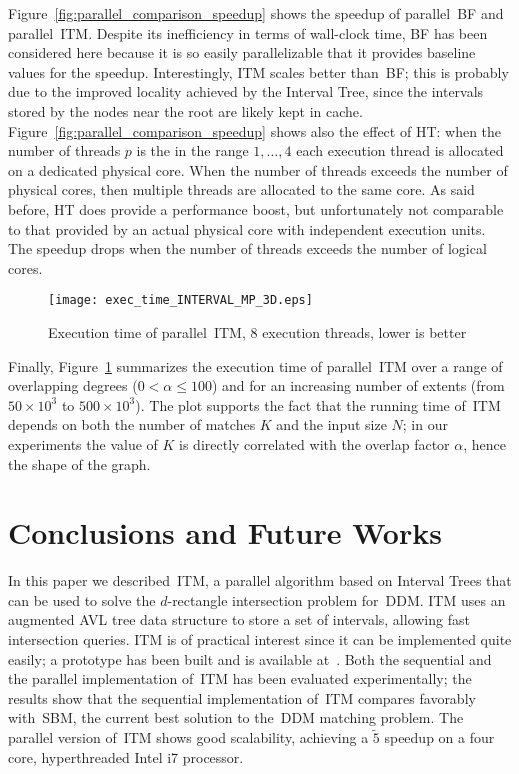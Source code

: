 \documentclass[10pt, conference, compsocconf]{IEEEtran}
\begin{document}
Figure~\ref{fig:parallel_comparison_speedup} shows the speedup of
parallel~\ac{BF} and parallel~\ac{ITM}. Despite its inefficiency in
terms of wall-clock time, \ac{BF} has been considered here because it
is so easily parallelizable that it provides baseline values for the
speedup. Interestingly, \ac{ITM} scales better than~\ac{BF}; this is
probably due to the improved locality achieved by the Interval Tree,
since the intervals stored by the nodes near the root are likely kept
in cache. Figure~\ref{fig:parallel_comparison_speedup} shows also the
effect of HT: when the number of threads $p$ is the in the range $1,
\ldots, 4$ each execution thread is allocated on a dedicated physical
core. When the number of threads exceeds the number of physical cores,
then multiple threads are allocated to the same core. As said before,
HT does provide a performance boost, but unfortunately not comparable
to that provided by an actual physical core with independent execution
units. The speedup drops when the number of threads exceeds the number
of logical cores.
 
\begin{figure}[t]
\centering\texttt{[image: exec\_time\_INTERVAL\_MP\_3D.eps]}
\caption{Execution time of parallel~\ac{ITM}, 8 execution threads, lower is better}\label{fig:parallel_ITM_scalability_evaluation}
\end{figure}

Finally, Figure~\ref{fig:parallel_ITM_scalability_evaluation}
summarizes the execution time of parallel~\ac{ITM} over a range of
overlapping degrees ($0 < \alpha \leq 100$) and for an increasing
number of extents (from $50 \times 10^3$ to $500 \times 10^3$). The
plot supports the fact that the running time of~\ac{ITM} depends on
both the number of matches $K$ and the input size $N$; in our
experiments the value of $K$ is directly correlated with the overlap
factor $\alpha$, hence the shape of the graph.
 

\section{Conclusions and Future Works}\label{sec:conclusions}

In this paper we described~\ac{ITM}, a parallel algorithm based on
Interval Trees that can be used to solve the $d$-rectangle
intersection problem for~\ac{DDM}. \ac{ITM} uses an augmented AVL tree
data structure to store a set of intervals, allowing fast intersection
queries. \ac{ITM} is of practical interest since it can be implemented
quite easily; a prototype has been built and is available
at~\cite{pads}.  Both the sequential and the parallel implementation
of~\ac{ITM} has been evaluated experimentally; the results show that
the sequential implementation of~\ac{ITM} compares favorably
with~\acl{SBM}, the current best solution to the~\ac{DDM} matching
problem. The parallel version of~\ac{ITM} shows good scalability,
achieving a $\tilde 5$ speedup on a four core, hyperthreaded Intel i7
processor.
\end{document}
